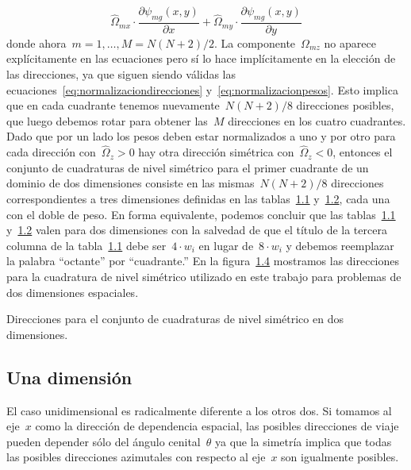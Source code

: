 \documentclass[
  12pt,
  a4paper,
  table]{scrbook}
\theoremstyle{plain}
\theoremstyle{definition}
\theoremstyle{plain}
\theoremstyle{plain}
\theoremstyle{remark}
\begin{document}
\[\hat{\Omega}_{mx} \cdot \frac{\partial{\psi_{mg}}(x,y)}{\partial x} + \hat{\Omega}_{my} \cdot \frac{\partial{\psi_{mg}(x,y)}}{\partial y}\]
donde ahora~\(m=1,\dots,M = N(N+2)/2\). La componente~\({\Omega}_{mz}\)
no aparece explícitamente en las ecuaciones pero sí lo hace
implícitamente en la elección de las direcciones, ya que siguen siendo
válidas las
ecuaciones~\protect\hyperlink{eq:normalizaciondirecciones}{{[}eq:normalizaciondirecciones{]}}
y~\protect\hyperlink{eq:normalizacionpesos}{{[}eq:normalizacionpesos{]}}.
Esto implica que en cada cuadrante tenemos nuevamente~\(N(N+2)/8\)
direcciones posibles, que luego debemos rotar para obtener las~\(M\)
direcciones en los cuatro cuadrantes. Dado que por un lado los pesos
deben estar normalizados a uno y por otro para cada dirección
con~\(\hat{\Omega}_z>0\) hay otra dirección simétrica
con~\(\hat{\Omega}_z<0\), entonces el conjunto de cuadraturas de nivel
simétrico para el primer cuadrante de un dominio de dos dimensiones
consiste en las mismas~\(N(N+2)/8\) direcciones correspondientes a tres
dimensiones definidas en las
tablas~\protect\hyperlink{tab:quadratureset}{1.1}
y~\protect\hyperlink{tab:mus}{1.2}, cada una con el doble de peso. En
forma equivalente, podemos concluir que las
tablas~\protect\hyperlink{tab:quadratureset}{1.1}
y~\protect\hyperlink{tab:mus}{1.2} valen para dos dimensiones con la
salvedad de que el título de la tercera columna de la
tabla~\protect\hyperlink{tab:quadratureset}{1.1} debe ser~\(4\cdot w_i\)
en lugar de~\(8\cdot w_i\) y debemos reemplazar la palabra ``octante''
por ``cuadrante.'' En la
figura~\protect\hyperlink{fig:direcciones2d}{1.4} mostramos las
direcciones para la cuadratura de nivel simétrico utilizado en este
trabajo para problemas de dos dimensiones espaciales.

\protect\hypertarget{fig:direcciones2d}{}{}Direcciones para el conjunto
de cuadraturas de nivel simétrico en dos dimensiones.

\hypertarget{una-dimensiuxf3n}{%
\subsection{Una dimensión}\label{una-dimensiuxf3n}}

El caso unidimensional es radicalmente diferente a los otros dos. Si
tomamos al eje~\(x\) como la dirección de dependencia espacial, las
posibles direcciones de viaje pueden depender sólo del ángulo
cenital~\(\theta\) ya que la simetría implica que todas las posibles
direcciones azimutales con respecto al eje~\(x\) son igualmente
posibles.
\end{document}
